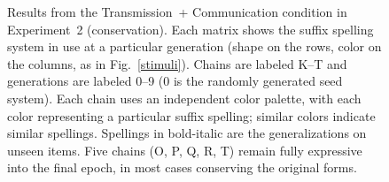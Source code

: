\documentclass[doc,biblatex]{apa7}
\begin{document}
	\begin{figure}
	\vspace*{2pt}
	\caption{Results from the Transmission~+ Communication condition in Experiment~2 (conservation). Each matrix shows the suffix spelling system in use at a particular generation (shape on the rows, color on the columns, as in Fig.~\ref{stimuli}). Chains are labeled K--T and generations are labeled 0–9 (0 is the randomly generated seed system). Each chain uses an independent color palette, with each color representing a particular suffix spelling; similar colors indicate similar spellings. Spellings in bold-italic are the generalizations on unseen items. Five chains (O, P, Q, R, T) remain fully expressive into the final epoch, in most cases conserving the original forms.}
	\label{con_com}
	\end{figure}
\end{document}
